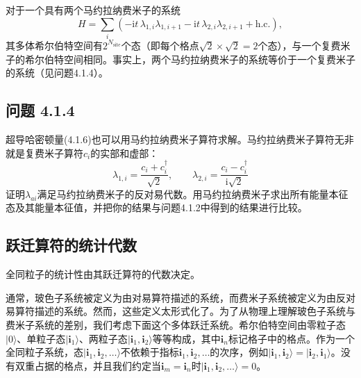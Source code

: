 对于一个具有两个马约拉纳费米子的系统
\begin{equation*}
H=\sum_{i}(-\mathrm{i}t\,\lambda_{1,i}\lambda_{1,i+1}-\mathrm{i}t\,\lambda_{2,i}\lambda_{2,i+1}+\text{h.c.}),
\end{equation*}
其多体希尔伯特空间有$2^{N_{\mathrm{site}}}$个态（即每个格点$\sqrt{2}\times\sqrt{2}=2$个态），与一个复费米子的希尔伯特空间相同。事实上，两个马约拉纳费米子的系统等价于一个复费米子的系统（见问题4.1.4）。

\subsection*{问题 4.1.4}

超导哈密顿量(4.1.6)也可以用马约拉纳费米子算符求解。马约拉纳费米子算符无非就是复费米子算符$c_{i}$的实部和虚部：
\begin{equation*}
\lambda_{1,i}=\frac{c_{i}+c_{i}^{\dagger}}{\sqrt{2}},\qquad \lambda_{2,i}=\frac{c_{i}-c_{i}^{\dagger}}{\mathrm{i}\sqrt{2}}
\end{equation*}
证明$\lambda_{ai}$满足马约拉纳费米子的反对易代数。用马约拉纳费米子求出所有能量本征态及其能量本征值，并把你的结果与问题4.1.2中得到的结果进行比较。

\subsection{跃迁算符的统计代数}

\begin{keypoints}
\item 全同粒子的统计性由其跃迁算符的代数决定。
\end{keypoints}

通常，玻色子系统被定义为由对易算符描述的系统，而费米子系统被定义为由反对易算符描述的系统。然而，这些定义太形式化了。为了从物理上理解玻色子系统与费米子系统的差别，我们考虑下面这个多体跃迁系统。希尔伯特空间由零粒子态$|0\rangle$、单粒子态$|\pmb{i}_1\rangle$、两粒子态$|\pmb{i}_1,\pmb{i}_2\rangle$等等构成，其中$\pmb{i}_n$标记格子中的格点。作为一个全同粒子系统，态$|\pmb{i}_1,\pmb{i}_2,\ldots\rangle$不依赖于指标$\pmb{i}_1,\pmb{i}_2,\ldots$的次序，例如$|\pmb{i}_1,\pmb{i}_2\rangle=|\pmb{i}_2,\pmb{i}_1\rangle$。没有双重占据的格点，并且我们约定当$\pmb{i}_m=\pmb{i}_n$时$|\pmb{i}_1,\pmb{i}_2,\ldots\rangle=0$。

